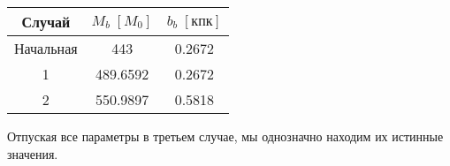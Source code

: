 \documentclass[a4paper, oneside]{article}
\begin{document}
\begin{table}[h]
  \centering
  \begin{tabular}{ccc}
    \toprule
    Случай &
    $ M_b \; [M_0] $ &
    $ b_b \; [\mathrm{кпк}] $ \\
    \midrule
    Начальная & 443 & 0.2672 \\
    1 & 489.6592 & 0.2672 \\
    2 & 550.9897 & 0.5818 \\
    \bottomrule
  \end{tabular}
\end{table}

Отпуская все параметры в третьем случае, мы однозначно находим их истинные значения.
\end{document}
